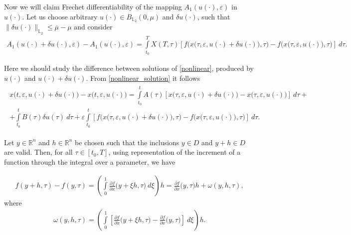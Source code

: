 \documentclass[../main.tex]{subfiles}
\begin{document}
Now we will claim Frechet differentiability of the mapping $A_1(u(\cdot),\varepsilon)$ in $u(\cdot)$.
Let us choose arbitrary $u(\cdot) \in B_{\mathbb{L}_2}(0,\mu)$ and $\delta u(\cdot)$, such that $\|\delta u(\cdot)\|_{\mathbb{L}_2} \leqslant \overline{\mu}-\mu$ and consider
\begin{gather}\label{diff_A}
	A_1(u(\cdot) + \delta u(\cdot),\varepsilon) - A_1(u(\cdot) ,\varepsilon) = \int\limits_{t_0}^T X(T,\tau) \left[ 
	f\Big(x\big(\tau,\varepsilon, u(\cdot) + \delta u(\cdot)\big),\tau\Big) - 
	f\Big(x\big(\tau,\varepsilon, u(\cdot)\big),\tau\Big) \right]\ d\tau.
\end{gather}

Here we should study the difference between solutions of \eqref{nonlinear}, produced by $u(\cdot)$ and $u(\cdot) + \delta u(\cdot)$. From \eqref{nonlinear_solution} it follows
\begin{gather}\label{diff_of_x}
	\begin{gathered}
		x\big(t,\varepsilon, u(\cdot) + \delta u(\cdot)\big) -
		x\big(t,\varepsilon, u(\cdot)\big) 
		= \int\limits_{t_0}^t A(\tau) \left[
		x\big(\tau,\varepsilon, u(\cdot) + \delta u(\cdot)\big) -
		x\big(\tau,\varepsilon, u(\cdot)\big) 
		\right]\ d\tau + \\ +
		\int\limits_{t_0}^t B(\tau) \delta u(\tau)\ d\tau +
		\varepsilon\int\limits_{t_0}^t \left[ 
		f\Big(x\big(\tau,\varepsilon, u(\cdot) + \delta u(\cdot)\big),\tau\Big) -
		f\Big(x\big(\tau,\varepsilon, u(\cdot)\big),\tau\Big)
		\right]\ d\tau.
	\end{gathered}
\end{gather}

Let $y \in \mathbb{R}^n$ and $h \in \mathbb{R}^n$ be chosen such that the inclusions   $y\in D$ and $y+h \in D$ are valid. Then, for all $\tau \in [t_0,T]$, using representation of the increment of a function through the integral over a parameter, we have

\begin{gather*}
	f(y + h, \tau) - f(y,\tau) = 
	\left( \int\limits_{0}^{1} 
	\frac{\partial f}{\partial x}  \big(y + \xi h, \tau\big)\ d\xi \right) h =
	\frac{\partial f}{\partial x}  \big(y, \tau\big) h + \omega(y,h,\tau),
\end{gather*}
where 
\begin{gather*}
	\omega(y,h,\tau) = \left( \int\limits_{0}^{1} 
	\left[\frac{\partial f}{\partial x}  \big(y + \xi h, \tau\big) -
	\frac{\partial f}{\partial x}  \big(y, \tau\big) \right] \ d \xi \right) h.
\end{gather*}
\end{document}
